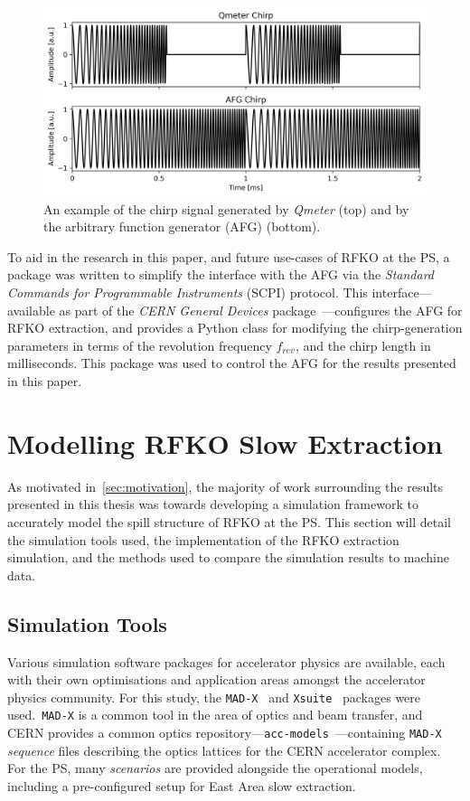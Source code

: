 \documentclass[a4paper,twoside,11pt]{report}
\begin{document}
\begin{figure}
  \centering
  \includegraphics[width=0.6\linewidth]{both-chirps.png}
  \caption[Comparison of chirp signals generated by \textit{Qmeter} and the AFG]{An example of the chirp signal generated by \textit{Qmeter} (top) and by the arbitrary function generator (AFG) (bottom).}\label{eq:both-chirps}
\end{figure}

To aid in the research in this paper, and future use-cases of RFKO at the PS, a package was written to simplify the interface with the AFG via the \textit{Standard Commands for Programmable Instruments} (SCPI) protocol. This interface---available as part of the \textit{CERN General Devices} package~\cite{cgd}---configures the AFG for RFKO extraction, and provides a Python class for modifying the chirp-generation parameters in terms of the revolution frequency $f_{rev}$, and the chirp length in milliseconds. This package was used to control the AFG for the results presented in this paper.


\section{Modelling RFKO Slow Extraction}\label{sec:rfko_sim}

As motivated in~\autoref{sec:motivation}, the majority of work surrounding the results presented in this thesis was towards developing a simulation framework to accurately model the spill structure of RFKO at the PS. This section will detail the simulation tools used, the implementation of the RFKO extraction simulation, and the methods used to compare the simulation results to machine data.

\subsection{Simulation Tools}

Various simulation software packages for accelerator physics are available, each with their own optimisations and application areas amongst the accelerator physics community. For this study, the \verb|MAD-X|~\cite{Iselin:MAD} and \verb|Xsuite|~\cite{xsuite} packages were used.~\verb|MAD-X| is a common tool in the area of optics and beam transfer, and CERN provides a common optics repository---\verb|acc-models|~\cite{optics_repo}---containing \verb|MAD-X| \textit{sequence} files describing the optics lattices for the CERN accelerator complex. For the PS, many \textit{scenarios} are provided alongside the operational models, including a pre-configured setup for East Area slow extraction.
\end{document}
